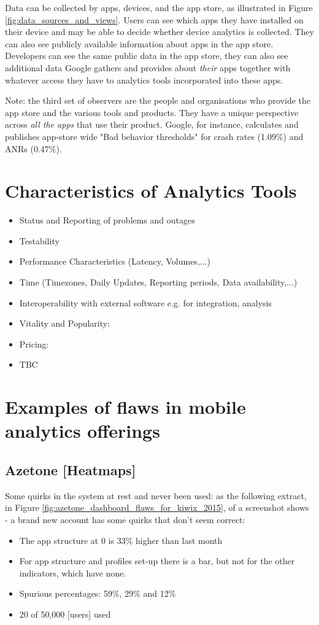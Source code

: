 Data can be collected by apps, devices, and the app store, as illustrated in Figure \ref{fig:data_sources_and_views}. Users can see which apps they have installed on their device and may be able to decide whether device analytics is collected. They can also see publicly available information about apps in the app store. Developers can see the same public data in the app store, they can also see additional data Google gathers and provides about \textit{their} apps together with whatever access they have to analytics tools incorporated into these apps.

Note: the third set of observers are the people and organisations who provide the app store and the various tools and products. They have a unique perspective across \textit{all the apps} that use their product. Google, for instance, calculates and publishes app-store wide "Bad behavior thresholds" for crash rates (1.09\%) and ANRs (0.47\%).

\section{Characteristics of Analytics Tools}


\begin{itemize}
    \item Status and Reporting of problems and outages
    \item Testability
    \item Performance Characteristics (Latency, Volumes,...)
    \item Time (Timezones, Daily Updates, Reporting periods, Data availability,...)
    \item Interoperability with external software e.g. for integration, analysis
    \item Vitality and Popularity: 
    \item Pricing:
    \item TBC
\end{itemize}

\section{Examples of flaws in mobile analytics offerings}
\subsection{Azetone [Heatmaps]}
Some quirks in the system at rest and never been used: as the following extract, in Figure \ref{fig:azetone_dashboard_flaws_for_kiwix_2015}, of a screenshot shows - a brand new account has some quirks that don’t seem correct:
\begin{itemize}
    \item The app structure at 0 is 33\% higher than last month
    \item For app structure and profiles set-up there is a bar, but not for the other indicators, which have none.
    \item Spurious percentages: 59\%, 29\% and 12\%
    \item 20 of 50,000 [users] used
\end{itemize}

